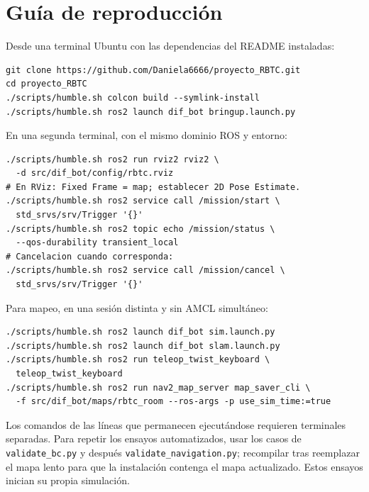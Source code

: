 \documentclass[11pt,a4paper]{article}
\newcommand{\archivo}[1]{\nolinkurl{#1}}
\begin{document}
\section{Guía de reproducción}
Desde una terminal Ubuntu con las dependencias del README instaladas:
\begin{lstlisting}
git clone https://github.com/Daniela6666/proyecto_RBTC.git
cd proyecto_RBTC
./scripts/humble.sh colcon build --symlink-install
./scripts/humble.sh ros2 launch dif_bot bringup.launch.py
\end{lstlisting}
En una segunda terminal, con el mismo dominio ROS y entorno:
\begin{lstlisting}
./scripts/humble.sh ros2 run rviz2 rviz2 \
  -d src/dif_bot/config/rbtc.rviz
# En RViz: Fixed Frame = map; establecer 2D Pose Estimate.
./scripts/humble.sh ros2 service call /mission/start \
  std_srvs/srv/Trigger '{}'
./scripts/humble.sh ros2 topic echo /mission/status \
  --qos-durability transient_local
# Cancelacion cuando corresponda:
./scripts/humble.sh ros2 service call /mission/cancel \
  std_srvs/srv/Trigger '{}'
\end{lstlisting}
Para mapeo, en una sesión distinta y sin AMCL simultáneo:
\begin{lstlisting}
./scripts/humble.sh ros2 launch dif_bot sim.launch.py
./scripts/humble.sh ros2 launch dif_bot slam.launch.py
./scripts/humble.sh ros2 run teleop_twist_keyboard \
  teleop_twist_keyboard
./scripts/humble.sh ros2 run nav2_map_server map_saver_cli \
  -f src/dif_bot/maps/rbtc_room --ros-args -p use_sim_time:=true
\end{lstlisting}
Los comandos de las líneas que permanecen ejecutándose requieren terminales separadas. Para repetir los ensayos automatizados, usar los casos de \archivo{validate_bc.py} y después \archivo{validate_navigation.py}; recompilar tras reemplazar el mapa lento para que la instalación contenga el mapa actualizado. Estos ensayos inician su propia simulación.
\end{document}

